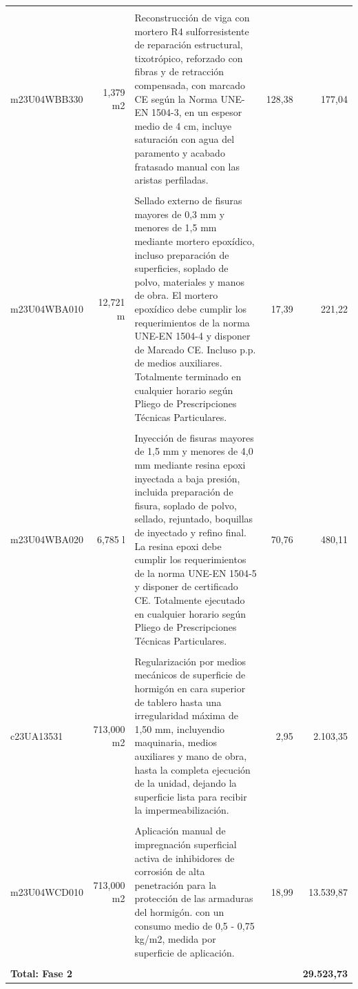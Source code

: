 \documentclass{book}%
\begin{document}
\begin{longtable}{lrlrr}
&&&&\\%
m23U04WBB330&     1,379 m2&\multicolumn{1}{p{5cm}}{Reconstrucción de viga con mortero R4 sulforresistente de reparación estructural, tixotrópico, reforzado con fibras y de retracción compensada, con marcado CE según la Norma UNE{-}EN 1504{-}3, en un espesor medio de 4 cm, incluye saturación con agua del paramento y acabado fratasado manual con las aristas perfiladas.}&    128,38&177,04\\%
&&&&\\%
m23U04WBA010&    12,721 m&\multicolumn{1}{p{5cm}}{Sellado externo de fisuras mayores de 0,3 mm y menores de 1,5 mm mediante mortero epoxídico, incluso preparación de superficies, soplado de polvo, materiales y manos de obra. El mortero epoxídico debe cumplir los requerimientos de la norma UNE{-}EN 1504{-}4 y disponer de Marcado CE. Incluso p.p. de medios auxiliares. Totalmente terminado en cualquier horario según Pliego de Prescripciones Técnicas Particulares.}&     17,39&221,22\\%
&&&&\\%
m23U04WBA020&     6,785 l&\multicolumn{1}{p{5cm}}{Inyección de fisuras mayores de 1,5 mm y menores de 4,0 mm mediante resina epoxi inyectada a baja presión, incluida preparación de fisura, soplado de polvo, sellado, rejuntado, boquillas de inyectado y refino final. La resina epoxi debe cumplir los requerimientos de la norma UNE{-}EN 1504{-}5 y disponer de certificado CE. Totalmente ejecutado en cualquier horario según Pliego de Prescripciones Técnicas Particulares.}&     70,76&480,11\\%
&&&&\\%
c23UA13531&   713,000 m2&\multicolumn{1}{p{5cm}}{Regularización por medios mecánicos de superficie de hormigón en cara superior de tablero hasta una irregularidad máxima de 1,50 mm, incluyendio maquinaria, medios auxiliares y mano de obra, hasta la completa ejecución de la unidad, dejando la superficie lista para recibir la impermeabilización.}&      2,95&2.103,35\\%
&&&&\\%
m23U04WCD010&   713,000 m2&\multicolumn{1}{p{5cm}}{Aplicación manual de impregnación superficial activa de inhibidores de corrosión de alta penetración para la protección de las armaduras del hormigón. con un consumo medio de 0,5 {-} 0,75 kg/m2, medida por superficie de aplicación.}&     18,99&13.539,87\\%
&&&&\\%
\multicolumn{4}{p{8cm}}{\textbf{Total: Fase 2}}&\textbf{29.523,73}\\%
\end{longtable}%
\normalsize
\end{document}
